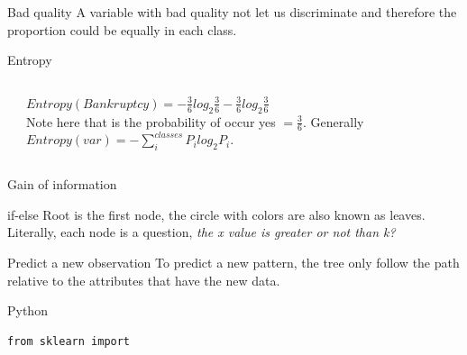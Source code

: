 \documentclass{beamer}
\begin{document}
\begin{frame}{Bad quality}
A variable with bad quality not let us discriminate and therefore the proportion could be equally in each class.

\end{frame}


\begin{frame}{Entropy}
\begin{columns} 
    \begin{column}{.2\textwidth}
\begin{table}[]
\centering
{}
\label{tab:my-table}
\end{table}
    \end{column}

\begin{column}{.7\textwidth}
$
Entropy(Bankruptcy) = -\frac{3}{6}log_{2}\frac{3}{6} - \frac{3}{6}log_{2}\frac{3}{6}$
\\
Note here that is the probability of occur yes $=\frac{3}{6}$.
Generally $Entropy(var) = - \sum_{i}^{classes} P_{i}log_{2}P_{i}$.

\end{column}
\end{columns}

\end{frame}


\begin{frame}{Gain of information}

\end{frame}






\begin{frame}[fragile]{if-else}
Root is the first node, the circle with colors are also known as leaves. Literally, each node is a question, \emph{the x value is greater or not than k?}




\end{frame}



\begin{frame}{Predict a new observation}
To predict a new pattern, the tree only follow the path relative to the attributes that have the new data.

\end{frame}




\begin{frame}[fragile]{Python}
\begin{lstlisting}
from sklearn import 

\end{lstlisting}
\end{frame}
\end{document}
